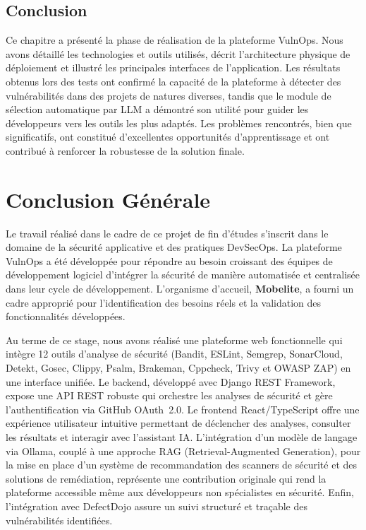 \documentclass[12pt, a4paper, oneside]{report}
\begin{document}
\section*{Conclusion}

Ce chapitre a présenté la phase de réalisation de la plateforme VulnOps.
Nous avons détaillé les technologies et outils utilisés, décrit l'architecture
physique de déploiement et illustré les principales interfaces de l'application.
Les résultats obtenus lors des tests ont confirmé la capacité de la plateforme
à détecter des vulnérabilités dans des projets de natures diverses, tandis que le
module de sélection automatique par LLM a démontré son utilité pour guider les
développeurs vers les outils les plus adaptés. Les problèmes rencontrés, bien que
significatifs, ont constitué d'excellentes opportunités d'apprentissage et ont
contribué à renforcer la robustesse de la solution finale.

\chapter*{Conclusion Générale}

Le travail réalisé dans le cadre de ce projet de fin d'études s'inscrit dans
le domaine de la sécurité applicative et des pratiques DevSecOps. La plateforme
VulnOps a été développée pour répondre au besoin croissant des équipes de
développement logiciel d'intégrer la sécurité de manière automatisée et centralisée
dans leur cycle de développement. L'organisme d'accueil, \textbf{Mobelite},
a fourni un cadre approprié pour l'identification des besoins réels et la
validation des fonctionnalités développées.

Au terme de ce stage, nous avons réalisé une plateforme web fonctionnelle qui
intègre 12 outils d'analyse de sécurité (Bandit, ESLint, Semgrep, SonarCloud,
Detekt, Gosec, Clippy, Psalm, Brakeman, Cppcheck, Trivy et OWASP ZAP) en une interface unifiée.
Le backend, développé avec Django REST Framework, expose une API REST robuste
qui orchestre les analyses de sécurité et gère l'authentification via GitHub OAuth~2.0.
Le frontend React/TypeScript offre une expérience utilisateur intuitive permettant
de déclencher des analyses, consulter les résultats et interagir avec l'assistant
IA. L'intégration d’un modèle de langage via Ollama, couplé à une approche RAG (Retrieval-Augmented Generation), pour la mise en place d’un système de recommandation des scanners de sécurité et des solutions de remédiation, représente une contribution originale qui rend la plateforme accessible même aux développeurs non spécialistes en sécurité. Enfin, l'intégration avec DefectDojo assure un suivi structuré et traçable des vulnérabilités identifiées.
\end{document}
